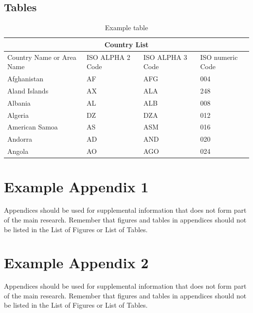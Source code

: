 \documentclass{imc-inf}
\begin{document}
\section{Tables}

\begin{table}[ht]
\begin{tabular}{ |p{3cm}||p{3cm}|p{3cm}|p{3cm}|  }
	\hline
	\multicolumn{4}{|c|}{Country List} \\
	\hline
	Country Name     or Area Name& ISO ALPHA 2 Code &ISO ALPHA 3 Code&ISO numeric Code\\
	\hline
	Afghanistan   & AF    &AFG&   004\\
	Aland Islands&   AX  & ALA   &248\\
	Albania &AL & ALB&  008\\
	Algeria    &DZ & DZA&  012\\
	American Samoa&   AS  & ASM&016\\
	Andorra& AD  & AND   &020\\
	Angola& AO  & AGO&024\\
	\hline
\end{tabular}
\caption{\label{tab:table-name}Example table}
\end{table}




%
%
%
%
%

\backmatter%
	
	
	

\begin{appendices} %
\chapter{Example Appendix 1}

Appendices should be used for supplemental information that does not form part of the main research. Remember that figures and tables in appendices should not be listed in the List of Figures or List of Tables. 

\chapter{Example Appendix 2}

Appendices should be used for supplemental information that does not form part of the main research. Remember that figures and tables in appendices should not be listed in the List of Figures or List of Tables. 
	
\end{appendices}
\end{document}
